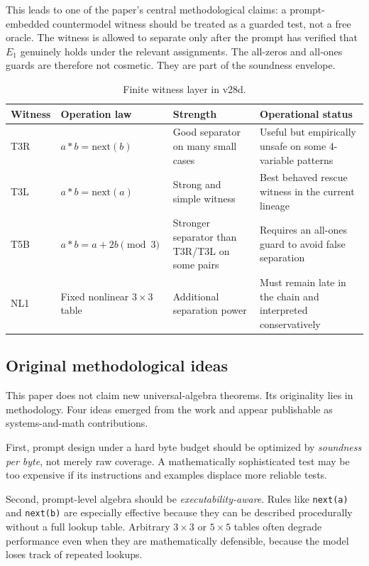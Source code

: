 \documentclass[12pt]{amsart}
\begin{document}
This leads to one of the paper's central methodological claims: a prompt-embedded countermodel witness should be treated as a guarded test, not a free oracle. The witness is allowed to separate only after the prompt has verified that $E_1$ genuinely holds under the relevant assignments. The all-zeros and all-ones guards are therefore not cosmetic. They are part of the soundness envelope.

\begin{table}[t]
\centering
\caption{Finite witness layer in v28d.}
\small
\begin{tabular}{>{\raggedright\arraybackslash}p{0.75in} >{\raggedright\arraybackslash}p{1.45in} >{\raggedright\arraybackslash}p{2.15in} >{\raggedright\arraybackslash}p{1.55in}}
\toprule
Witness & Operation law & Strength & Operational status \\
\midrule
T3R & $a*b = \mathrm{next}(b)$ & Good separator on many small cases & Useful but empirically unsafe on some $4$-variable patterns \\
T3L & $a*b = \mathrm{next}(a)$ & Strong and simple witness & Best behaved rescue witness in the current lineage \\
T5B & $a*b = a+2b \pmod 3$ & Stronger separator than T3R/T3L on some pairs & Requires an all-ones guard to avoid false separation \\
NL1 & Fixed nonlinear $3 \times 3$ table & Additional separation power & Must remain late in the chain and interpreted conservatively \\
\bottomrule
\end{tabular}
\normalsize
\end{table}

\subsection{Original methodological ideas}

This paper does not claim new universal-algebra theorems. Its originality lies in methodology. Four ideas emerged from the work and appear publishable as systems-and-math contributions.

First, prompt design under a hard byte budget should be optimized by \emph{soundness per byte}, not merely raw coverage. A mathematically sophisticated test may be too expensive if its instructions and examples displace more reliable tests.

Second, prompt-level algebra should be \emph{executability-aware}. Rules like \texttt{next(a)} and \texttt{next(b)} are especially effective because they can be described procedurally without a full lookup table. Arbitrary $3 \times 3$ or $5 \times 5$ tables often degrade performance even when they are mathematically defensible, because the model loses track of repeated lookups.
\end{document}
